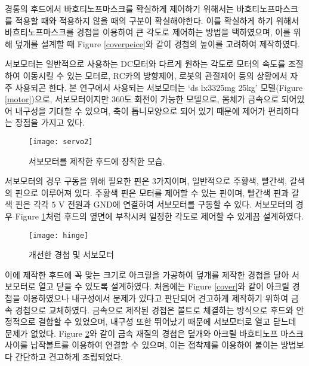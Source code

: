 경통의 후드에서 바흐티노프마스크를 확실하게 제어하기 위해서는 바흐티노프마스크를 적용할 때와 적용하지 않을 때의 구분이 확실해야한다. 이를 확실하게 하기 위해서 바흐티노프마스크를 경첩을 이용하여 큰 각도로 제어하는 방법을 택하였으며, 이를 위해 덮개를 설계할 때 \textrm{Figure} \ref{coverpeice}와 같이 경첩의 높이를 고려하여 제작하였다.

서보모터는 일반적으로 사용하는 DC모터와 다르게 원하는 각도로 모터의 속도를 조절하여 이동시킬 수 있는 모터로,  RC카의 방향제어, 로봇의 관절제어 등의 상황에서 자주 사용되곤 한다. 본 연구에서 사용되는 서보모터는 ‘ds lx3325mg 25kg’ 모델(\textrm{Figure} \ref{motor})으로, 서보모터이지만 360도 회전이 가능한 모델으로, 몸체가 금속으로 되어있어 내구성을 기대할 수 있으며, 축이 톱니모양으로 되어 있기 때문에 제어가 편리하다는 장점을 가지고 있다.

\begin{figure}[h]
	\begin{center}
		\texttt{[image: servo2]}
	\end{center}
	\caption{서보모터를 제작한 후드에 장착한 모습.}
	\label{motorcover}
\end{figure}

서보모터의 경우 구동을 위해 필요한 핀은 3가지이며, 일반적으로 주황색, 빨간색, 갈색의 핀으로 이루어져 있다. 주황색 핀은 모터를 제어할 수 있는 핀이며, 빨간색 핀과 갈색 핀은 각각 $\textrm{5 V}$ 전원과 GND에 연결하여 서보모터를 구동할 수 있다. 서보모터의 경우 \textrm{Figure} \ref{motorcover}처럼 후드의 옆면에 부착시켜 일정한 각도로 제어할 수 있게끔 설계하였다.
\begin{figure}[h]
	\begin{center}
		\texttt{[image: hinge]}
	\end{center}
	\caption{개선한 경첩 및 서보모터}
	\label{hinge}
\end{figure}



이에 제작한 후드에 꼭 맞는 크기로 아크릴을 가공하여 덮개를 제작한 경첩을 달아 서보모터로 열고 닫을 수 있도록 설계하였다. 처음에는 \textrm{Figure} \ref{cover}와 같이 아크릴 경첩을 이용하였으나 내구성에서 문제가 있다고 판단되어 견고하게 제작하기 위하여 금속 경첩으로 교체하였다. 금속으로 제작된 경첩은 볼트로 체결하는 방식으로 후드와 안정적으로 결합할 수 있었으며, 내구성 또한 뛰어났기 때문에 서보모터로 열고 닫느데 문제가 없었다. \textrm{Figure} \ref{hinge}와 같이 금속 재질의 경첩은 덮개와 아크릴 바흐티노프 마스크 사이를 납작볼트를 이용하여 연결할 수 있으며, 이는 접착제를 이용하여 붙이는 방법보다 간단하고 견고하게 조립되었다.

